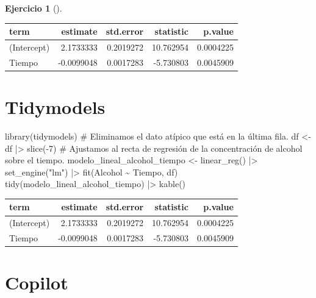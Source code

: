 \documentclass[
  a4paper,
]{scrreport}
\newenvironment{Shaded}{\begin{snugshade}}{\end{snugshade}}
\newcommand{\CommentTok}[1]{\textcolor[rgb]{0.37,0.37,0.37}{#1}}
\newcommand{\DecValTok}[1]{\textcolor[rgb]{0.68,0.00,0.00}{#1}}
\newcommand{\FunctionTok}[1]{\textcolor[rgb]{0.28,0.35,0.67}{#1}}
\newcommand{\NormalTok}[1]{\textcolor[rgb]{0.00,0.23,0.31}{#1}}
\newcommand{\OtherTok}[1]{\textcolor[rgb]{0.00,0.23,0.31}{#1}}
\newcommand{\SpecialCharTok}[1]{\textcolor[rgb]{0.37,0.37,0.37}{#1}}
\newcommand{\StringTok}[1]{\textcolor[rgb]{0.13,0.47,0.30}{#1}}
\theoremstyle{definition}
\newtheorem{exercise}{Ejercicio}[chapter]
\theoremstyle{remark}
\begin{document}
\begin{exercise}[]
\begin{enumerate}
\begin{tcolorbox}
  \begin{longtable}[]{@{}lrrrr@{}}
  \toprule\noalign{}
  term & estimate & std.error & statistic & p.value \\
  \midrule\noalign{}
  \endhead
  \bottomrule\noalign{}
  \endlastfoot
  (Intercept) & 2.1733333 & 0.2019272 & 10.762954 & 0.0004225 \\
  Tiempo & -0.0099048 & 0.0017283 & -5.730803 & 0.0045909 \\
  \end{longtable}

  \section{Tidymodels}

\begin{Shaded}
\begin{Highlighting}[]
\FunctionTok{library}\NormalTok{(tidymodels)}
\CommentTok{\# Eliminamos el dato atípico que está en la última fila.}
\NormalTok{df }\OtherTok{\textless{}{-}}\NormalTok{ df }\SpecialCharTok{|\textgreater{}} \FunctionTok{slice}\NormalTok{(}\SpecialCharTok{{-}}\DecValTok{7}\NormalTok{)}
\CommentTok{\# Ajustamos al recta de regresión de la concentración de alcohol sobre el tiempo.}
\NormalTok{modelo\_lineal\_alcohol\_tiempo }\OtherTok{\textless{}{-}} \FunctionTok{linear\_reg}\NormalTok{() }\SpecialCharTok{|\textgreater{}}
  \FunctionTok{set\_engine}\NormalTok{(}\StringTok{"lm"}\NormalTok{) }\SpecialCharTok{|\textgreater{}} 
  \FunctionTok{fit}\NormalTok{(Alcohol }\SpecialCharTok{\textasciitilde{}}\NormalTok{ Tiempo, df)}
\FunctionTok{tidy}\NormalTok{(modelo\_lineal\_alcohol\_tiempo) }\SpecialCharTok{|\textgreater{}} \FunctionTok{kable}\NormalTok{()}
\end{Highlighting}
\end{Shaded}

  \begin{longtable}[]{@{}lrrrr@{}}
  \toprule\noalign{}
  term & estimate & std.error & statistic & p.value \\
  \midrule\noalign{}
  \endhead
  \bottomrule\noalign{}
  \endlastfoot
  (Intercept) & 2.1733333 & 0.2019272 & 10.762954 & 0.0004225 \\
  Tiempo & -0.0099048 & 0.0017283 & -5.730803 & 0.0045909 \\
  \end{longtable}

  \section{Copilot}


\end{tcolorbox}
\end{enumerate}
\end{exercise}
\end{document}
